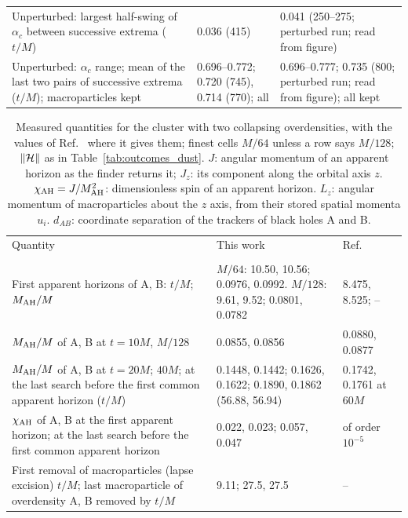 \begin{table}
\begin{ruledtabular}
\begin{tabular}{p{}p{}p{}}
\raggedright Unperturbed: largest half-swing of $\alpha_c$ between successive extrema ($t/M$) & \raggedright 0.036 (415) & \raggedright 0.041 (250--275; perturbed run; read from figure) \tabularnewline
\raggedright Unperturbed: $\alpha_c$ range; mean of the last two pairs of successive extrema ($t/M$); macroparticles kept & \raggedright 0.696--0.772; 0.720 (745), 0.714 (770); all & \raggedright 0.696--0.777; 0.735 (800; perturbed run; read from figure); all kept \tabularnewline
\end{tabular}
\end{ruledtabular}
\end{table}

\begin{table}
\caption{Measured quantities for the cluster with two collapsing overdensities, with the values of Ref.~\cite{Wu:2026nrpic} where it gives them; finest cells $M/64$ unless a row says $M/128$; $\|\mathcal{H}\|$ as in Table~\ref{tab:outcomes_dust}. $J$: angular momentum of an apparent horizon as the finder returns it; $J_z$: its component along the orbital axis $z$. $\chi_{\rm AH}=J/M_{\rm AH}^2$: dimensionless spin of an apparent horizon. $L_z$: angular momentum of macroparticles about the $z$ axis, from their stored spatial momenta $u_i$. $d_{AB}$: coordinate separation of the trackers of black holes A and B.}
\label{tab:outcomes_overdensities}
\footnotesize
\setlength{\tabcolsep}{3pt}
\begin{ruledtabular}
\begin{tabular}{p{}p{}p{}}
Quantity & This work & Ref.~\cite{Wu:2026nrpic} \tabularnewline
\colrule
\multicolumn{3}{l}{\textit{Envelope at the speed-matched areal radius $13.3M$}} \tabularnewline
\raggedright First apparent horizons of A, B: $t/M$; $M_{\rm AH}/M$ & \raggedright $M/64$: 10.50, 10.56; 0.0976, 0.0992. $M/128$: 9.61, 9.52; 0.0801, 0.0782 & \raggedright 8.475, 8.525; -- \tabularnewline
\raggedright $M_{\rm AH}/M$ of A, B at $t=10M$, $M/128$ & \raggedright 0.0855, 0.0856 & \raggedright 0.0880, 0.0877 \tabularnewline
\raggedright $M_{\rm AH}/M$ of A, B at $t=20M$; $40M$; at the last search before the first common apparent horizon ($t/M$) & \raggedright 0.1448, 0.1442; 0.1626, 0.1622; 0.1890, 0.1862 (56.88, 56.94) & \raggedright 0.1742, 0.1761 at $60M$ \tabularnewline
\raggedright $\chi_{\rm AH}$ of A, B at the first apparent horizon; at the last search before the first common apparent horizon & \raggedright 0.022, 0.023; 0.057, 0.047 & \raggedright of order $10^{-5}$ \tabularnewline
\raggedright First removal of macroparticles (lapse excision) $t/M$; last macroparticle of overdensity A, B removed by $t/M$ & \raggedright 9.11; 27.5, 27.5 & \raggedright -- \tabularnewline

\end{tabular}
\end{ruledtabular}
\end{table}
